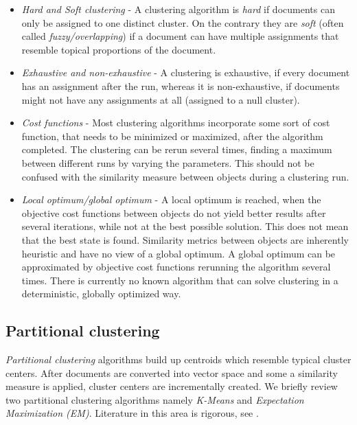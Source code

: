   \begin{itemize}
    \item \emph{Hard and Soft clustering} - A clustering algorithm is \emph{hard} if documents can only be assigned to one distinct cluster. On the contrary they are \emph{soft} (often called \emph{fuzzy/overlapping}) if a document can have multiple assignments that resemble topical proportions of the document.
    \item \emph{Exhaustive and non-exhaustive} - A clustering is exhaustive, if every document has an assignment after the run, whereas it is non-exhaustive, if documents might not have any assignments at all (assigned to a null cluster).
    \item \emph{Cost functions} - Most clustering algorithms incorporate some sort of cost function, that needs to be minimized or maximized, after the algorithm completed. The clustering can be rerun several times, finding a maximum between different runs by varying the parameters. This should not be confused with the similarity measure between objects during a clustering run.
    \item \emph{Local optimum/global optimum} - A local optimum is reached, when the objective cost functions between objects do not yield better results after several iterations, while not at the best possible solution. This does not mean that the best state is found. Similarity metrics between objects are inherently heuristic and have no view of a global optimum. A global optimum can be approximated by objective cost functions rerunning the algorithm several times. There is currently no known algorithm that can solve clustering in a deterministic, globally optimized way.
  \end{itemize}

  \subsection{Partitional clustering}
  \label{sec:partitional}

    \emph{Partitional clustering} algorithms build up centroids which resemble typical cluster centers. After documents are converted into vector space and some a similarity measure is applied, cluster centers are incrementally created. We briefly review two partitional clustering algorithms namely \emph{K-Means} and \emph{Expectation Maximization (EM)}. Literature in this area is rigorous, see \cite{ClusteringBooAggarwalk2013, NextFrontierClustering2013, IRBookStanford2008}.

